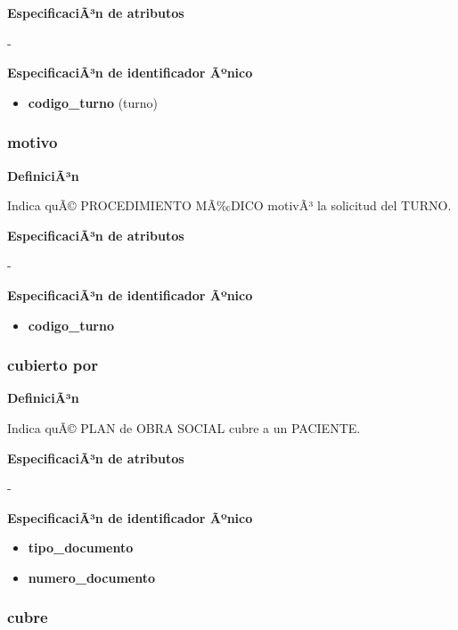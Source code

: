 \documentclass[a4paper,11pt]{article}
\begin{document}
\textbf{EspecificaciÃ³n de atributos}

-

\textbf{EspecificaciÃ³n de identificador Ãºnico}

\begin{itemize}

     \item \textbf{codigo\_turno} (turno)

\end{itemize}

\subsubsection{\textbf{motivo}}

\textbf{DefiniciÃ³n}

Indica quÃ© PROCEDIMIENTO MÃ‰DICO motivÃ³ la solicitud del TURNO.

\textbf{EspecificaciÃ³n de atributos}

-

\textbf{EspecificaciÃ³n de identificador Ãºnico}

\begin{itemize}

     \item \textbf{codigo\_turno}

\end{itemize}

\subsubsection{\textbf{cubierto por}}

\textbf{DefiniciÃ³n}

Indica quÃ© PLAN de OBRA SOCIAL cubre a un PACIENTE.

\textbf{EspecificaciÃ³n de atributos}

-

\textbf{EspecificaciÃ³n de identificador Ãºnico}

\begin{itemize}

     \item \textbf{tipo\_documento}

     \item \textbf{numero\_documento}

\end{itemize}

\subsubsection{\textbf{cubre}}
\end{document}
